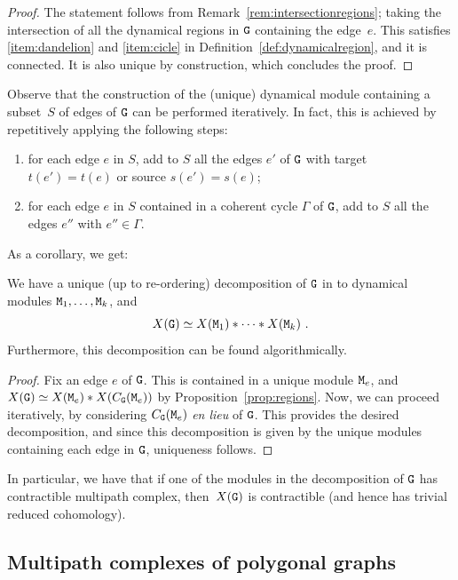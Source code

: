 \documentclass{amsart}
\begin{document}
\begin{proof}
The statement follows from Remark~\ref{rem:intersectionregions};  taking the intersection of all the dynamical regions in ${\tt G}$ containing the edge~$e$. This satisfies \ref{item:dandelion} and \ref{item:cicle}
in Definition~\ref{def:dynamicalregion}, and it is connected.
It is also unique by construction, which concludes the proof. 
\end{proof}

Observe that the construction of the (unique) dynamical module containing a subset~$S$ of edges of ${\tt G}$ can be performed iteratively. In fact, this is achieved by repetitively applying the following steps:
\begin{enumerate}
    \item for each edge $e$ in $S$, add to $S$ all the edges $ e'$ of ${\tt G}$ with target $t(e')=t(e)$ or source $s(e')=s(e)$;
    \item for each edge $e$ in $S$ contained in a coherent cycle $\Gamma$ of ${\tt G}$, add to $S$ all the edges $ e''$ with $e''\in \Gamma$.
\end{enumerate}
As a corollary, we get:
  
 \begin{thm}\label{thm:module} 
We have a unique (up to re-ordering) decomposition of ${\tt G}$ in to dynamical modules ${\tt M}_1,\dots,{\tt M}_{k}$, and 
 \[X({\tt G}) \simeq X({\tt M}_1) \ast \cdots \ast X({\tt M}_k) \ .\]
 Furthermore, this decomposition can be found algorithmically.
 \end{thm}
 
 \begin{proof}
 Fix an edge $e$ of ${\tt G}$. This is contained in a unique module ${\tt M}_{e}$, and $X({\tt G}) \simeq X({\tt M}_e) \ast X(C_{{\tt G}}({\tt M}_{e}))$ by Proposition~\ref{prop:regions}. Now, we can proceed iteratively, by considering $C_{{\tt G}}({\tt M}_{e})$ \emph{en lieu} of ${\tt G}$.
 This provides the desired decomposition, and since this decomposition is given by the unique modules containing each edge in ${\tt G}$, uniqueness follows. 
 \end{proof}
 
In particular, we have that if one of the modules in the decomposition of ${\tt G}$ has contractible multipath complex, then~$X({\tt G})$ is contractible (and hence has trivial reduced cohomology).

\subsection{Multipath complexes of  polygonal graphs}
\end{document}
